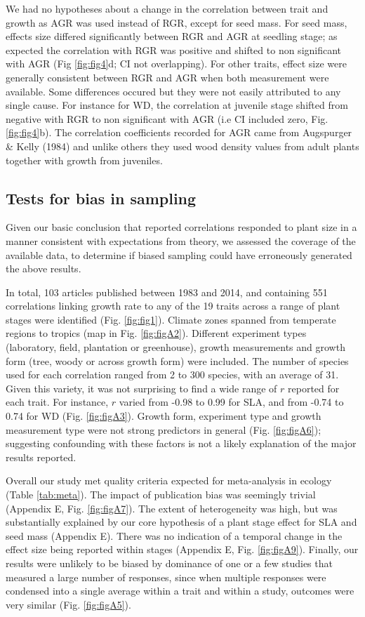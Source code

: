 \documentclass[a4paper,11pt]{article}
\begin{document}
We had no hypotheses about a change in the correlation between trait and growth as AGR was used instead of RGR, except for seed mass. For seed mass, effects size differed significantly between RGR and AGR at seedling stage; as expected the correlation with RGR was positive and shifted to non significant with AGR (Fig \ref{fig:fig4}d; CI not overlapping). For other traits, effect size were generally consistent between RGR and AGR when both measurement were available. Some differences occured but they were not easily attributed to any single cause. For instance for WD, the correlation at juvenile stage shifted from negative with RGR to non significant with AGR (i.e CI included zero, Fig. \ref{fig:fig4}b). The correlation coefficients recorded for AGR came from Augspurger & Kelly (1984) and unlike others they used wood density values from adult plants together with growth from juveniles. 

\subsection*{Tests for bias in sampling}

Given our basic conclusion that reported correlations responded to plant size in a manner consistent with expectations from theory, we assessed the coverage of the available data, to determine if biased sampling could have erroneously generated the above results.

In total, 103 articles published between 1983 and 2014, and containing 551 correlations linking growth rate to any of the 19 traits across a range of plant stages were identified (Fig. \ref{fig:fig1}). Climate zones spanned from temperate regions to tropics (map in Fig. \ref{fig:figA2}). Different experiment types (laboratory, field, plantation or greenhouse), growth measurements and growth form (tree, woody or across growth form) were included. The number of species used for each correlation ranged from 2 to 300 species, with an average of 31. Given this variety, it was not surprising to find a wide range of $r$ reported for each trait. For instance, $r$ varied from -0.98 to 0.99 for SLA, and from -0.74 to 0.74 for WD (Fig. \ref{fig:figA3}). Growth form, experiment type and growth measurement type were not strong predictors in general (Fig. \ref{fig:figA6}); suggesting confounding with these factors is not a likely explanation of the major results reported.

Overall our study met quality criteria expected for meta-analysis in ecology (Table \ref{tab:meta}). The impact of publication bias was seemingly trivial (Appendix E, Fig. \ref{fig:figA7}). The extent of heterogeneity was high, but was substantially explained by our core hypothesis of a plant stage effect for SLA and seed mass (Appendix E). There was no indication of a temporal change in the effect size being reported within stages (Appendix E, Fig. \ref{fig:figA9}). Finally, our results were unlikely to be biased by dominance of one or a few studies that measured a large number of responses, since when multiple responses were condensed into a single average within a trait and within a study, outcomes were very similar (Fig. \ref{fig:figA5}).
\end{document}
